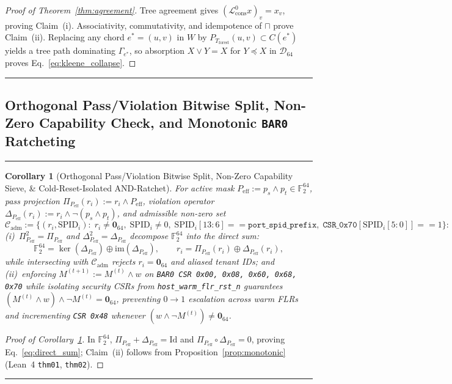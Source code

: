 \documentclass[10pt,twocolumn]{article}
\makeatletter
\newif\ifspecintwocol \specintwocolfalse
\newif\ifspecresume   \specresumefalse
\newcommand{\StartTwoCol}{%
  \if@twocolumn
    \let\spec@next\@empty
  \else
    \ifspecintwocol
      \let\spec@next\@empty
    \else
      \global\specintwocoltrue
      \def\spec@next{\begin{multicols}{2}}%
    \fi
  \fi
  \spec@next
}
\newcommand{\StopTwoCol}{%
  \if@twocolumn
    \onecolumn
    \global\specintwocolfalse
    \let\spec@next\@empty
  \else
    \ifspecintwocol
      \global\specintwocolfalse
      \def\spec@next{\end{multicols}}%
    \else
      \let\spec@next\@empty
    \fi
  \fi
  \spec@next
}
\newcommand{\BeginConnesPlate}{%
  \if@twocolumn
    \onecolumn
    \global\specresumetrue
    \let\spec@platepre\@empty
  \else
    \ifspecintwocol
      \global\specresumetrue
      \let\spec@platepre\StopTwoCol
    \else
      \global\specresumefalse
      \let\spec@platepre\@empty
    \fi
  \fi
  \spec@platepre
  \par\vspace{4pt}\noindent\textcolor{black!25}{\rule{\textwidth}{0.4pt}}\par\vspace{3pt}%
}
\newcommand{\EndConnesPlate}{%
  \par\vspace{3pt}\noindent\textcolor{black!25}{\rule{\textwidth}{0.4pt}}\par\vspace{4pt}%
  \ifspecresume
    \global\specresumefalse
    \let\spec@platepost\StartTwoCol
  \else
    \let\spec@platepost\@empty
  \fi
  \spec@platepost
}
\theoremstyle{spectralthm}
\newtheorem{corollary}[theorem]{Corollary}
\makeatother
\begin{document}
\begin{proof}[Proof of Theorem~\ref{thm:agreement}]
Tree agreement gives $(\mathcal{L}_{\mathrm{cons}}^0 x)_v = x_v$, proving Claim~(i). Associativity, commutativity, and idempotence of $\sqcap$ prove Claim~(ii). Replacing any chord $e^* = (u,v)$ in $W$ by $P_{T_{\mathrm{forest}}}(u,v) \subset C(e^*)$ yields a tree path dominating $\Gamma_{e^*}$, so absorption $X \vee Y = X$ for $Y \preceq X$ in $\mathcal{D}_{64}$ proves Eq.~\eqref{eq:kleene_collapse}.
\end{proof}
\EndConnesPlate

\subsection{Orthogonal Pass/Violation Bitwise Split, Non-Zero Capability Check, and Monotonic \texorpdfstring{\texttt{BAR0}}{BAR0} Ratcheting}

\BeginConnesPlate
\begin{corollary}[Orthogonal Pass/Violation Bitwise Split, Non-Zero Capability Sieve, \& Cold-Reset-Isolated AND-Ratchet]
\label{cor:ratchet}
For active mask $P_{\mathrm{eff}} := p_s \wedge p_t \in \mathbb{F}_2^{64}$, pass projection $\Pi_{P_{\mathrm{eff}}}(r_i) := r_i \wedge P_{\mathrm{eff}}$, violation operator $\Delta_{P_{\mathrm{eff}}}(r_i) := r_i \wedge \neg(p_s \wedge p_t)$, and admissible non-zero set
\[
\mathcal{C}_{\mathrm{adm}} := \bigl\{(r_i, \mathrm{SPID}_i) :\; r_i \neq \mathbf{0}_{64},\; \mathrm{SPID}_i \neq 0,\;
\mathrm{SPID}_i[13:6] == \texttt{port\_spid\_prefix},\;
\texttt{CSR\_0x70}[\mathrm{SPID}_i[5:0]] == 1\bigr\}:
\]
(i)~$\Pi_{P_{\mathrm{eff}}}^2 = \Pi_{P_{\mathrm{eff}}}$ and $\Delta_{P_{\mathrm{eff}}}^2 = \Delta_{P_{\mathrm{eff}}}$ decompose $\mathbb{F}_2^{64}$ into the direct sum:
\begin{equation}
\label{eq:direct_sum}
\mathbb{F}_2^{64} = \ker(\Delta_{P_{\mathrm{eff}}}) \oplus \mathrm{im}(\Delta_{P_{\mathrm{eff}}}),\qquad
r_i = \Pi_{P_{\mathrm{eff}}}(r_i) \oplus \Delta_{P_{\mathrm{eff}}}(r_i),
\end{equation}
while intersecting with $\mathcal{C}_{\mathrm{adm}}$ rejects $r_i = \mathbf{0}_{64}$ and aliased tenant IDs; and
(ii)~enforcing $M^{(t+1)} := M^{(t)} \wedge w$ on \texttt{BAR0 CSR 0x00, 0x08, 0x60, 0x68, 0x70} while isolating security CSRs from \texttt{host\_warm\_flr\_rst\_n} guarantees $(M^{(t)} \wedge w) \wedge \neg M^{(t)} = \mathbf{0}_{64}$, preventing $0 \rightarrow 1$ escalation across warm FLRs and incrementing \texttt{CSR 0x48} whenever $(w \wedge \neg M^{(t)}) \neq \mathbf{0}_{64}$.
\end{corollary}
\begin{proof}[Proof of Corollary~\ref{cor:ratchet}]
In $\mathbb{F}_2^{64}$, $\Pi_{P_{\mathrm{eff}}} + \Delta_{P_{\mathrm{eff}}} = \mathrm{Id}$ and $\Pi_{P_{\mathrm{eff}}} \circ \Delta_{P_{\mathrm{eff}}} = 0$, proving Eq.~\eqref{eq:direct_sum}; Claim~(ii) follows from Proposition~\ref{prop:monotonic} (Lean~4 \texttt{thm01}, \texttt{thm02}).
\end{proof}
\EndConnesPlate
\end{document}
